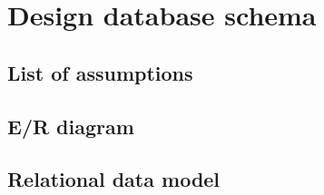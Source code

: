 \documentclass[12pt, a4paper]{article}
\begin{document}
\section*{Design database schema}
\subsection*{List of assumptions}
\subsection*{E/R diagram}
\subsection*{Relational data model}
\end{document}

